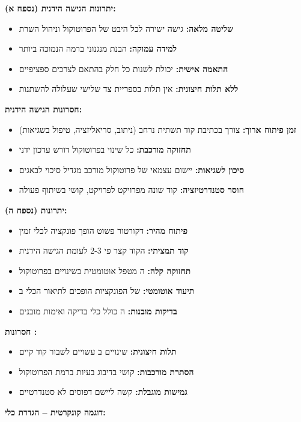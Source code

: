 \textbf{יתרונות הגישה הידנית (נספח א):}
\begin{itemize}
\item \textbf{שליטה מלאה:} גישה ישירה לכל היבט של הפרוטוקול וניהול השרת
\item \textbf{למידה עמוקה:} הבנת מנגנוני  ברמה הנמוכה ביותר
\item \textbf{התאמה אישית:} יכולת לשנות כל חלק בהתאם לצרכים ספציפיים
\item \textbf{ללא תלות חיצונית:} אין תלות בספריית צד שלישי שעלולה להשתנות
\end{itemize}

\textbf{חסרונות הגישה הידנית:}
\begin{itemize}
\item \textbf{זמן פיתוח ארוך:} צורך בכתיבת קוד תשתית נרחב (ניתוב, סריאליזציה, טיפול בשגיאות)
\item \textbf{תחזוקה מורכבת:} כל שינוי בפרוטוקול דורש עדכון ידני
\item \textbf{סיכון לשגיאות:} יישום עצמאי של פרוטוקול מורכב מגדיל סיכוי לבאגים
\item \textbf{חוסר סטנדרטיזציה:} קוד שונה מפרויקט לפרויקט, קושי בשיתוף פעולה
\end{itemize}

\textbf{יתרונות  (נספח ה):}
\begin{itemize}
\item \textbf{פיתוח מהיר:} דקורטור  פשוט הופך פונקציה לכלי  זמין
\item \textbf{קוד תמציתי:} הקוד קצר פי \num{2}-\num{3} לעומת הגישה הידנית
\item \textbf{תחזוקה קלה:} ה מטפל אוטומטית בשינויים בפרוטוקול
\item \textbf{תיעוד אוטומטי:}  של הפונקציות הופכים לתיאור הכלי ב
\item \textbf{בדיקות מובנות:} ה כולל כלי בדיקה ואימות מובנים
\end{itemize}

\textbf{חסרונות :}
\begin{itemize}
\item \textbf{תלות חיצונית:} שינויים ב עשויים לשבור קוד קיים
\item \textbf{הסתרת מורכבות:} קושי בדיבוג בעיות ברמת הפרוטוקול
\item \textbf{גמישות מוגבלת:} קשה ליישם דפוסים לא סטנדרטיים
\end{itemize}

\textbf{דוגמה קונקרטית – הגדרת כלי:}

